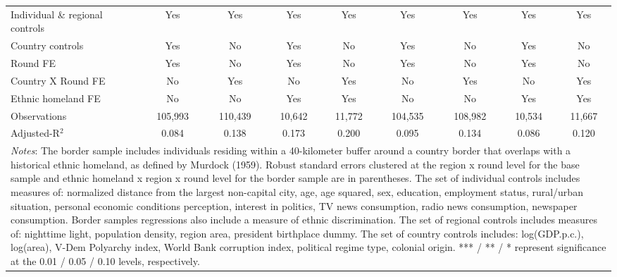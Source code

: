 \documentclass[11pt]{article}
\theoremstyle{plain}
\theoremstyle{plain}
\begin{document}
\begin{table}[H]
{\begin{tabular}{@{\extracolsep{5pt}} l c c c c c c c c}
\midrule
     \smallskip
    Individual \& regional controls  & Yes & Yes & Yes & Yes  & Yes & Yes & Yes & Yes \\
    \smallskip
    Country controls & Yes& No& Yes& No& Yes& No& Yes& No\\
    \smallskip
    Round FE & Yes & No& Yes & No & Yes & No& Yes & No\\
    \smallskip
    Country X Round FE       & No & Yes& No & Yes& No & Yes& No & Yes\\
    \smallskip
    Ethnic homeland FE & No & No & Yes& Yes& No & No & Yes& Yes\\
    \smallskip
    Observations           &      105,993   &      110,439   &       10,642   &       11,772  &      104,535   &      108,982   &       10,534   &       11,667    \\
    Adjusted-R$^2$         &      0.084   &       0.138   &       0.173   &       0.200   &       0.095   &       0.134   &       0.086   &       0.120 \\
                          \bottomrule
    \multicolumn{9}{p{21cm}}{\footnotesize \emph{Notes}: The border sample includes individuals residing within a 40-kilometer buffer around a country border that overlaps with a historical ethnic homeland, as defined by Murdock (1959). Robust standard errors clustered at the region x round level  for the base sample and ethnic homeland x region x round level for the border sample are in parentheses. The set of individual controls
    includes measures of: normalized distance from the largest non-capital city, age, age squared, sex,
    education, employment status, rural/urban situation, personal economic conditions perception, interest in politics, TV news consumption, radio news consumption, newspaper consumption. Border samples regressions also include a measure of ethnic discrimination. The set of regional controls includes measures of: nighttime light, population density, region area, president birthplace dummy. The set of country controls includes: log(GDP.p.c.), log(area), V-Dem Polyarchy index, World Bank corruption index, political regime type, colonial origin. *** / ** / * represent significance at the 0.01 / 0.05 / 0.10 levels, respectively.}
    \end{tabular}
    }
    \end{table}
\end{document}
